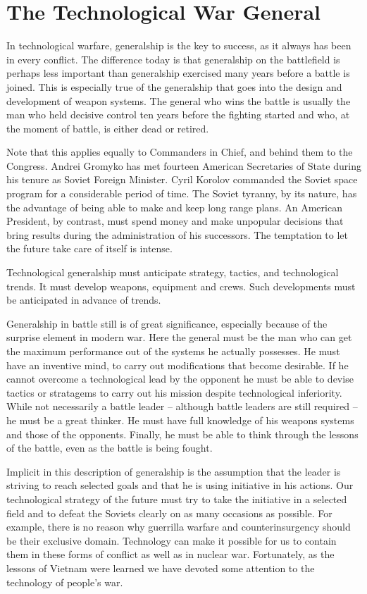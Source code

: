 \section{The Technological War General}
In technological warfare, generalship is the key to success, as it always has been in every conflict. The difference today is that generalship on the battlefield is perhaps less important than generalship exercised many years before a battle is joined. This is especially true of the generalship that goes into the design and development of weapon systems. The general who wins the battle is usually the man who held decisive control ten years before the fighting started and who, at the moment of battle, is either dead or retired.

Note that this applies equally to Commanders in Chief, and behind them to the Congress. Andrei Gromyko has met fourteen American Secretaries of State during his tenure as Soviet Foreign Minister. Cyril Korolov commanded the Soviet space program for a considerable period of time. The Soviet tyranny, by its nature, has the advantage of being able to make and keep long range plans. An American President, by contrast, must spend money and make unpopular decisions that bring results during the administration of his successors. The temptation to let the future take care of itself is intense.

Technological generalship must anticipate strategy, tactics, and technological trends. It must develop weapons, equipment and crews. Such developments must be anticipated in advance of trends.

Generalship in battle still is of great significance, especially because of the surprise element in modern war. Here the general must be the man who can get the maximum performance out of the systems he actually possesses. He must have an inventive mind, to carry out modifications that become desirable. If he cannot overcome a technological lead by the opponent he must be able to devise tactics or stratagems to carry out his mission despite technological inferiority. While not necessarily a battle leader -- although battle leaders are still required -- he must be a great thinker. He must have full knowledge of his weapons systems and those of the opponents. Finally, he must be able to think through the lessons of the battle, even as the battle is being fought.

Implicit in this description of generalship is the assumption that the leader is striving to reach selected goals and that he is using initiative in his actions. Our technological strategy of the future must try to take the initiative in a selected field and to defeat the Soviets clearly on as many occasions as possible. For example, there is no reason why guerrilla warfare and counterinsurgency should be their exclusive domain. Technology can make it possible for us to contain them in these forms of conflict as well as in nuclear war. Fortunately, as the lessons of Vietnam were learned we have devoted some attention to the technology of people's war.

